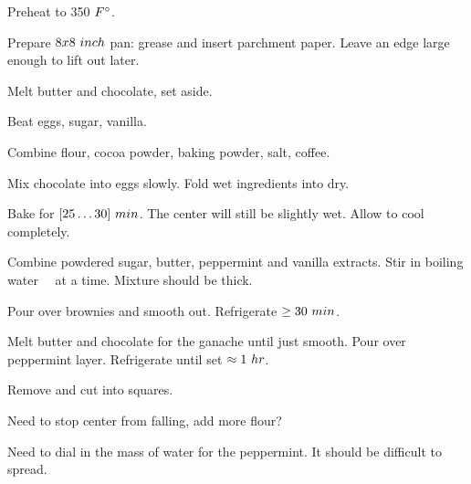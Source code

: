 \begin{preparation}
\item Preheat to 350 $\Fahrenheit$.

\item Prepare $8x8~\inch$ pan: grease and insert parchment paper.
	Leave an edge large enough to lift out later.

\item Melt butter and chocolate, set aside.

\item Beat eggs, sugar, vanilla.

\item Combine flour, cocoa powder, baking powder, salt, coffee.

\item Mix chocolate into eggs slowly.
	Fold wet ingredients into dry.

\item Bake for $[25 \ldots 30]~\minute$.
	The center will still be slightly wet.
	Allow to cool completely.

\item Combine powdered sugar, butter, peppermint and vanilla extracts.
	Stir in boiling water \onehalf~\teaspoon~at a time.
	Mixture should be thick.

\item Pour over brownies and smooth out.
	Refrigerate $\ge 30~\minute$.

\item Melt butter and chocolate for the ganache until just smooth.
	Pour over peppermint layer.
	Refrigerate until set $\approx 1~\hour$.

\item Remove and cut into squares.
\end{preparation}


\begin{experiments}
\item Need to stop center from falling, add more flour?
\item Need to dial in the mass of water for the peppermint.
	It should be difficult to spread.
\end{experiments}


\recipeend
